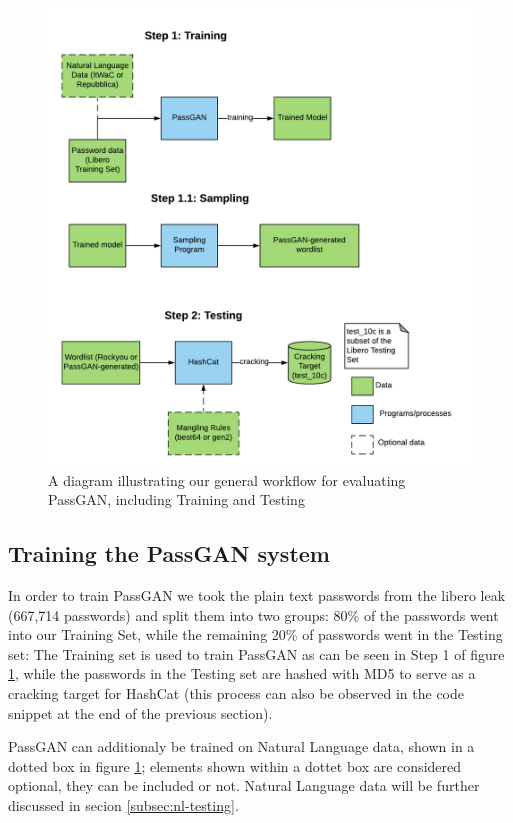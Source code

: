 \begin{figure}[H]
\centering
    \includegraphics[scale=0.8]{figures/testing_flowchart_fixed.png}
    \caption{A diagram illustrating our general workflow for evaluating PassGAN, including Training and Testing}
    \label{fig:testing_flowchart}
\end{figure}    

\subsection{Training the PassGAN system}\label{subsec:passgan-training}
In order to train PassGAN we took the plain text passwords from the libero leak (667,714 passwords) and split them into two groups: 80\% of the passwords went into our Training Set, while the remaining 20\% of passwords went in the Testing set: The Training set is used to train PassGAN as can be seen in Step 1 of figure \ref{fig:testing_flowchart}, while the passwords in the Testing set are hashed with MD5 to serve as a cracking target for HashCat (this process can also be observed in the code snippet at the end of the previous section).

PassGAN can additionaly be trained on Natural Language data, shown in a dotted box in figure \ref{fig:testing_flowchart}; elements shown within a dottet box are considered optional, they can be included or not. Natural Language data will be further discussed in secion \ref{subsec:nl-testing}.

